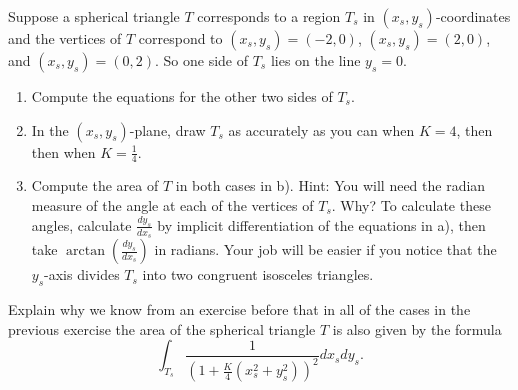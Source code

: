 \documentclass{ximera}
\begin{document}
Suppose a spherical triangle $T$ corresponds to a region $T_{s}$ in
$\left( x_{s},y_{s}\right) $-coordinates and the vertices of $T$
correspond to $\left( x_{s},y_{s}\right) =\left( -2,0\right) $,
$\left( x_{s} ,y_{s}\right) =\left( 2,0\right) $, and $\left(
x_{s},y_{s}\right) =\left( 0,2\right) $. So one side of $T_{s}$ lies
on the line $y_{s}=0$.

\begin{exercise}\label{st}\hfil
\begin{enumerate}
\item Compute the equations for the other two sides of $T_{s}$.
\item In the $\left( x_{s},y_{s}\right) $-plane, draw $T_{s}$ as
  accurately as you can when $K=4$, then then when $K=\frac{1}{4}$.
\item Compute the area of $T$ in both cases in b).
Hint: You will need the radian measure of the angle at each of the
vertices of $T_{s}$. Why? To calculate these angles, calculate
$\frac{dy_{s}}{dx_{s}}$ by implicit differentiation of the equations
in a), then take $\arctan\left( \frac{dy_{s}}{dx_{s}}\right)
$ in radians. Your job will be easier if you notice that the
$y_{s}$-axis divides $T_{s}$ into two congruent isosceles triangles.
\end{enumerate}
\end{exercise}

\begin{exercise}
Explain why we know from an exercise before that in all of
the cases in the previous exercise %
the area of the spherical triangle $T$
is also given by the formula%
\[%
\int_{T_{s}}
\frac{1}{\left(  1+\frac{K}{4}\left(  x_{s}^{2}+y_{s}^{2}\right)  \right)
^{2}}dx_{s}dy_{s}.
\]

\end{exercise}
\end{document}
